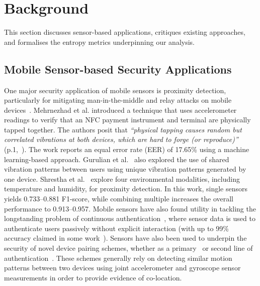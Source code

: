 \section{Background}
\label{sec:background}


This section discusses sensor-based applications, critiques existing approaches, and formalises the entropy metrics underpinning our analysis.

\subsection{Mobile Sensor-based Security Applications}

One major security application of mobile sensors is proximity detection, particularly for mitigating man-in-the-middle and relay attacks on mobile devices~\cite{halevi2012secure,mehrnezhad2015tap,gurulian2018good,markantonakis2024using,shrestha2014drone}. Mehrnezhad et al.\cite{mehrnezhad2015tap} introduced a technique that uses accelerometer readings to verify that an NFC payment instrument and terminal are physically tapped together. The authors posit that \emph{``physical tapping causes random but correlated vibrations at both devices, which are hard to forge (or reproduce)''} (p.1,~\cite{mehrnezhad2015tap}). The work reports an equal error rate (EER) of 17.65\% using a machine learning-based approach. Gurulian et al.~\cite{gurulian2018good} also explored the use of shared vibration patterns between users using unique vibration patterns generated by one device. Shrestha et al.~\cite{shrestha2014drone} explore four environmental modalities, including temperature and humidity, for proximity detection. In this work, single sensors yields 0.733--0.881 F1-score, while combining multiple increases the overall performance to 0.913--0.957. Mobile sensors have also found utility in tackling the longstanding problem of continuous authentication~\cite{patel2016continuous,mekruksavanich2021deep,hayashi2013casa,riva2012progressive,shi2011senguard,micallef2015aren,miettinen2014conxsense,li2013unobservable}, where sensor data is used to authenticate users passively without explicit interaction (with up to 99\% accuracy claimed in some work~\cite{mekruksavanich2021deep}). Sensors have also been used to underpin the security of novel device pairing schemes, whether as a primary~\cite{pan2018universense} or second line of authentication~\cite{mayrhofer2009shake}. These schemes generally rely on detecting similar motion patterns between two devices using joint accelerometer and gyroscope sensor measurements in order to provide evidence of co-location.%

